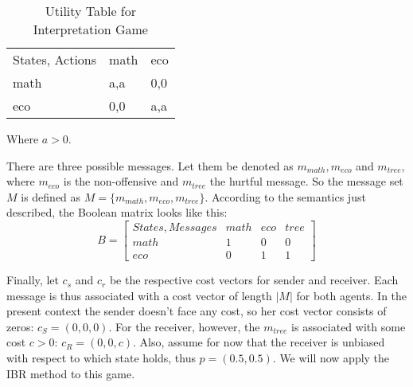 \documentclass[10]{article}
\begin{document}
\begin{table}[h]
\centering
\caption{Utility Table for Interpretation Game}
\label{my-label}
\begin{tabular}{lll}
States, Actions & math & eco \\
math            & a,a  & 0,0 \\
eco             & 0,0  & a,a
\end{tabular}
\end{table}
Where $a>0$.

There are three possible messages. Let them be denoted as $m_{math},m_{eco}$ and $m_{tree}$, where $m_{eco}$ is the non-offensive and $m_{tree}$ the hurtful message. So the message set $M$ is defined as $M=\{m_{math},m_{eco},m_{tree}\}$. According to the semantics just described, the Boolean matrix looks like this:\\
\begin{equation*}
B =
\begin{bmatrix}

States, Messages & math & eco & tree \\
math             & 1    & 0   & 0    \\
eco              & 0    & 1   & 1   
\end{bmatrix}
\end{equation*}

Finally, let $c_s$ and $c_r$ be the respective cost vectors for sender and receiver. Each message is thus associated with a cost vector of length $|M|$ for both agents. In the present context the sender doesn't face any cost, so her cost vector consists of zeros: $c_S=(0,0,0)$. For the receiver, however, the $m_{tree}$ is associated with some cost $c>0$: $c_R=(0,0,c)$.
Also, assume for now that the receiver is unbiased with respect to which state holds, thus $p=(0.5,0.5)$.
We will now apply the IBR method to this game. 
\end{document}
